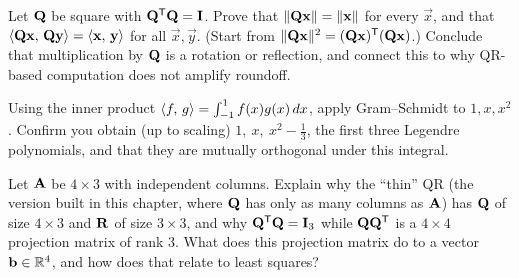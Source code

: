 \begin{exercise}
Let $\mathbf{Q}$ be square with $\mathbf{Q}^{\mathsf{T}}\mathbf{Q}=\mathbf{I}$. Prove that
$\lVert\mathbf{Q}\mathbf{x}\rVert=\lVert\mathbf{x}\rVert$ for every $\vec{x}$, and that
$\langle \mathbf{Q}\mathbf{x},\, \mathbf{Q}\mathbf{y} \rangle=\langle \mathbf{x},\, \mathbf{y} \rangle$ for all $\vec{x},
\vec{y}$. (Start from $\lVert\mathbf{Q}\mathbf{x}\rVert^2=(\mathbf{Q}\mathbf{x})^{\mathsf{T}}(\mathbf{Q}\mathbf{x})$.)
Conclude that multiplication by $\mathbf{Q}$ is a rotation or reflection, and connect this
to why QR-based computation does not amplify roundoff.
\end{exercise}

\begin{exercise}
Using the inner product $\langle f,\, g \rangle=\int_{-1}^{1}f(x)g(x)\,dx$, apply Gram--Schmidt
to $1,x,x^2$. Confirm you obtain (up to scaling) $1,\ x,\ x^2-\tfrac13$, the first three
Legendre polynomials, and that they are mutually orthogonal under this integral.
\end{exercise}

\begin{exercise}
Let $\mathbf{A}$ be $4\times 3$ with independent columns. Explain why the ``thin'' QR (the
version built in this chapter, where $\mathbf{Q}$ has only as many columns as $\mathbf{A}$) has
$\mathbf{Q}$ of size $4\times 3$ and $\mathbf{R}$ of size $3\times 3$, and why
$\mathbf{Q}^{\mathsf{T}}\mathbf{Q}=\mathbf{I}_3$ while $\mathbf{Q}\mathbf{Q}^{\mathsf{T}}$ is a $4\times 4$ projection matrix of rank
$3$. What does this projection matrix do to a vector $\mathbf{b}\in\mathbb{R}^4$, and how does that
relate to least squares?
\end{exercise}
